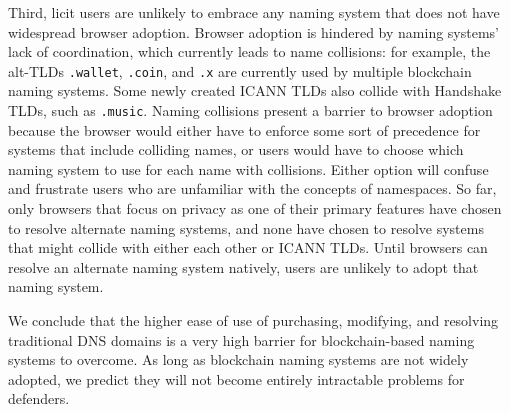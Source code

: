 Third, licit users are unlikely to embrace any naming system that does not have 
widespread browser 
adoption. Browser adoption is hindered by naming systems' lack of coordination, 
which currently leads 
to name collisions: for example, the alt-TLDs 
\texttt{.wallet}, 
\texttt{.coin}, and \texttt{.x} 
are currently used by multiple blockchain naming systems. Some newly created 
ICANN TLDs also collide 
with Handshake TLDs, such as \texttt{.music}. Naming collisions present a 
barrier to browser adoption 
because the browser would either have to enforce some sort of precedence for 
systems that include 
colliding names, or users would have to choose which naming system to use for 
each name with 
collisions. Either option will confuse and frustrate users who are unfamiliar 
with the concepts of 
namespaces. So far, only browsers that focus on privacy as one of their primary 
features have chosen 
to resolve alternate naming systems, and none have chosen to resolve systems 
that might collide with 
either each other or ICANN TLDs. Until browsers can resolve an alternate naming 
system natively, users 
are unlikely to adopt that naming system.

We conclude that the higher ease of use of purchasing, 
modifying, and resolving traditional DNS 
domains is a very high barrier for blockchain-based naming 
systems to overcome. As long as blockchain naming systems are 
not widely adopted, we predict they will not become entirely 
intractable problems for defenders.